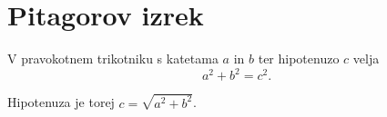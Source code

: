 \documentclass{article}
\begin{document}
\section*{Pitagorov izrek}

V pravokotnem trikotniku s katetama \(a\) in \(b\)
ter hipotenuzo \(c\) velja
\[
a^2 + b^2 = c^2.
\]

Hipotenuza je torej \(c = \sqrt{a^2 + b^2}\).
\end{document}
